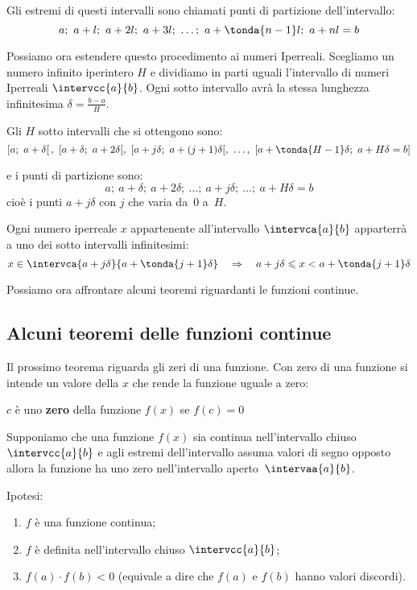 Gli estremi di questi intervalli sono chiamati punti di partizione 
dell'intervallo:
\[a;~a+l;~a+2l;~a+3l;~\dots;~a+\tonda{n-1}l;~a+nl=b\]

Possiamo ora estendere questo procedimento ai numeri Iperreali.
Scegliamo un numero infinito iperintero \(H\) e dividiamo in parti 
uguali l'intervallo di numeri Iperreali \(\intervcc{a}{b}\). Ogni 
sotto intervallo avrà la stessa lunghezza infinitesima \(\delta=\frac{b-a}{H}\).

Gli \(H\) sotto intervalli che si ottengono sono:
\[\left[a;~a+\delta \right[,~[a+\delta;~a+2\delta[,~
[a+j\delta;~a+(j+1)\delta[,~\dots,~
[a+\tonda{H-1}\delta;~a+H\delta=b]\]

e i punti di partizione sono:
\[a;~a+\delta;~a+2\delta;~\dots;~a+j\delta;~\dots;~a+H\delta=b\]
cioè i punti \(a+j\delta\) con \(j\) che varia da~0 a~\(H\).

Ogni numero iperreale \(x\) appartenente all'intervallo \(\intervca{a}{b}\)
apparterrà a uno dei sotto intervalli infinitesimi:
\[x \in \intervca{a+j\delta}{a+\tonda{j+1}\delta} \quad \Rightarrow \quad 
  a+j\delta \leqslant x < a+\tonda{j+1}\delta\]

Possiamo ora affrontare alcuni teoremi riguardanti le funzioni continue.

\subsection{Alcuni teoremi delle funzioni continue}
\label{subsec:cont_iperinteri}

Il prossimo teorema riguarda gli zeri di una funzione. Con zero di una funzione 
si intende un valore della \(x\) che rende la funzione uguale a zero:

\begin{definizione}
 \(c\) è uno \textbf{zero} della funzione \(f(x)\) se \(f(c)=0\)
\end{definizione}

\begin{teorema}
Supponiamo che una funzione \(f(x)\) sia continua nell'intervallo chiuso
\(\intervcc{a}{b}\) e agli estremi dell'intervallo assuma valori di segno 
opposto allora la funzione ha uno zero nell'intervallo 
aperto~\(\intervaa{a}{b}\).
\end{teorema}

\noindent Ipotesi:
\begin{enumerate}[nosep]
 \item \(f\) è una funzione continua;
 \item \(f\) è definita nell'intervallo chiuso \(\intervcc{a}{b}\);
 \item \(f(a) \cdot f(b) < 0\) 
 (equivale a dire che \(f(a)\) e \(f(b)\) hanno valori discordi).
\end{enumerate}

